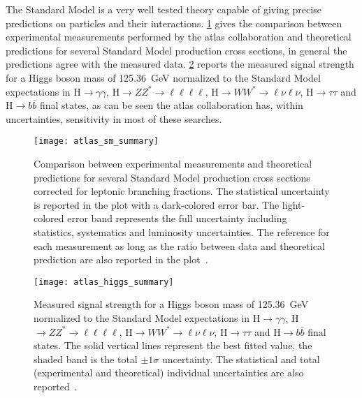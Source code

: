 The Standard Model is a very well tested theory capable of giving precise
predictions on particles and their interactions. \cref{fig:sm_summary_plot}
gives the comparison between experimental measurements performed by the
\gls{atlas} collaboration and theoretical predictions for several Standard Model
production cross sections, in general the predictions agree with the measured
data. \cref{fig:higgs_summary_plot} reports the measured signal strength for a
Higgs boson mass of 125.36~GeV normalized to the Standard Model expectations in
H$\rightarrow \gamma \gamma$,
H$\rightarrow ZZ^* \rightarrow \ell \ell \ell \ell$,
H$\rightarrow W W^* \rightarrow \ell \nu \ell \nu$, H$\rightarrow \tau \tau$ and
H$\rightarrow b \bar{b}$ final states, as can be seen the \gls{atlas}
collaboration has, within uncertainties, sensitivity in most of these searches.
\begin{figure}[!h]
  \centering
  \texttt{[image: atlas\_sm\_summary]}
  \caption{Comparison between experimental measurements and theoretical
    predictions for several Standard Model production cross sections corrected
    for leptonic branching fractions. The statistical uncertainty is reported in
    the plot with a dark-colored error bar. The light-colored error band
    represents the full uncertainty including statistics, systematics and
    luminosity uncertainties. The reference for each measurement as long as the
    ratio between data and theoretical prediction are also reported in the
    plot~\cite{SMPubPlots}.}
  \label{fig:sm_summary_plot}
\end{figure}
\begin{figure}[!h]
  \centering
  \texttt{[image: atlas\_higgs\_summary]}
  \caption{Measured signal strength for a Higgs boson mass of 125.36~GeV
    normalized to the Standard Model expectations in
    H$\rightarrow \gamma \gamma$,
    H$\rightarrow ZZ^* \rightarrow \ell \ell \ell \ell$,
    H$\rightarrow W W^* \rightarrow \ell \nu \ell \nu$, H$\rightarrow \tau \tau$
    and H$\rightarrow b \bar{b}$ final states. The solid vertical lines
    represent the best fitted value, the shaded band is the total $\pm 1 \sigma$
    uncertainty. The statistical and total (experimental and theoretical)
    individual uncertainties are also reported~\cite{HiggsPubPlots}.}
  \label{fig:higgs_summary_plot}
\end{figure}
